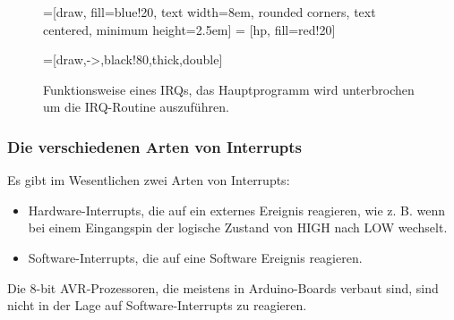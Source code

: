 \begin{figure}[ht]
\begin{center}

=[draw, fill=blue!20, text width=8em, rounded corners,
    text centered, minimum height=2.5em]
 = [hp, fill=red!20]
 
=[draw,->,black!80,thick,double]
    
\def\blockdist{3.3}
\def\edgedist{2.5}

 
\caption{Funktionsweise eines IRQs, das Hauptprogramm wird unterbrochen um die IRQ-Routine auszuführen.}
\label{fig:irq}
\end{center}
\end{figure}



\subsubsection{Die verschiedenen Arten von Interrupts}
Es gibt im Wesentlichen zwei Arten von Interrupts:
\begin{itemize}
\item Hardware-Interrupts, die auf ein externes Ereignis reagieren, wie z. B. wenn bei einem Eingangspin 
der logische Zustand von HIGH nach LOW wechselt.
\item Software-Interrupts, die  auf eine Software Ereignis reagieren.
\end{itemize}
Die 8-bit AVR-Prozessoren,  die meistens in Arduino-Boards verbaut sind, sind  nicht in der Lage auf 
Software-Interrupts zu reagieren.

